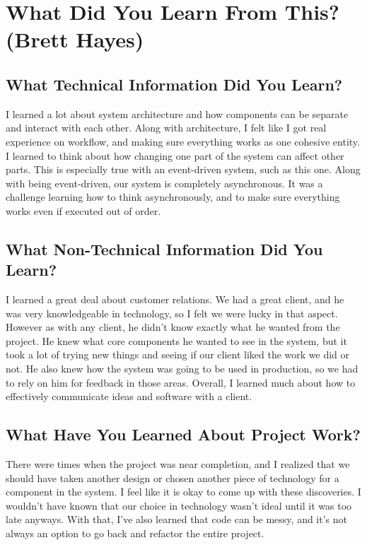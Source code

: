 \documentclass[10pt, onecolumn, twoside, peerreview]{IEEEtran}
\begin{document}
\section{What Did You Learn From This? (Brett Hayes)}
\subsection{What Technical Information Did You Learn?}
I learned a lot about system architecture and how components can be separate and interact with each other. Along with architecture, I felt like I got real experience on workflow, and making sure everything works as one cohesive entity. I learned to think about how changing one part of the system can affect other parts. This is especially true with an event-driven system, such as this one. Along with being event-driven, our system is completely asynchronous. It was a challenge learning how to think asynchronously, and to make sure everything works even if executed out of order.

\subsection{What Non-Technical Information Did You Learn?}
I learned a great deal about customer relations. We had a great client, and he was very knowledgeable in technology, so I felt we were lucky in that aspect. However as with any client, he didn't know exactly what he wanted from the project. He knew what core components he wanted to see in the system, but it took a lot of trying new things and seeing if our client liked the work we did or not. He also knew how the system was going to be used in production, so we had to rely on him for feedback in those areas. Overall, I learned much about how to effectively communicate ideas and software with a client.

\subsection{What Have You Learned About Project Work?}
There were times when the project was near completion, and I realized that we should have taken another design or chosen another piece of technology for a component in the system. I feel like it is okay to come up with these discoveries. I wouldn't have known that our choice in technology wasn't ideal until it was too late anyways. With that, I've also learned that code can be messy, and it's not always an option to go back and refactor the entire project.
\end{document}
